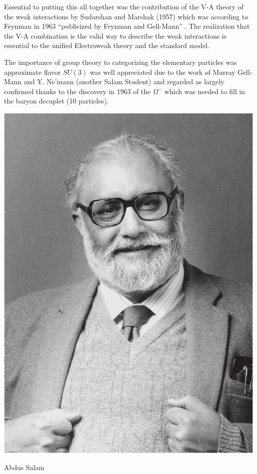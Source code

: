 \documentclass[letterpaper,twoside,preprintnumbers,slac_one]{revtex4}
\begin{document}
Essential to putting this all together was the contribution of the V-A theory of the weak
interactions by Sudarshan and Marshak (1957) which was according to Feynman in 1963 ``publicized by
Feynman and Gell-Mann'' \cite{gmf;1958}. The realization that the V-A combination is
the valid way to describe the weak interactions is essential to the
unified Electroweak theory and the standard model.

The importance of group theory to categorizing the elementary
particles was approximate flavor $SU(3)$ was well appreciated due to
the work of Murray Gell-Mann \cite{mg;1962} and Y. Ne'mann
\cite{yn;1961} (another Salam Student) and regarded as largely
confirmed thanks to the discovery in 1963 of the $\Omega^{-}$ which
was needed to fill in the baryon decuplet (10 particles).

\begin{center}
  \includegraphics[scale=0.5]{salam.jpg}

  Abdus Salam
\end{center}
\end{document}

